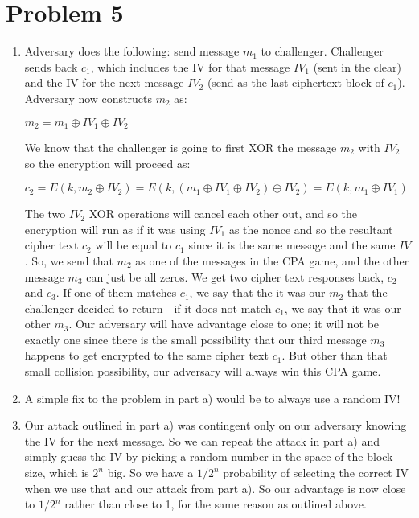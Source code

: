 \documentclass{article}
\begin{document}
\section*{Problem 5}
\begin{enumerate}

\item %
Adversary does the following: send message $m_1$ to challenger. Challenger sends back $c_1$, which includes the IV for that message $IV_1$ (sent in the clear) and the IV for the next message $IV_2$ (send as the last ciphertext block of $c_1$). Adversary now constructs $m_2$ as:

$m_2 = m_1 \oplus IV_1 \oplus IV_2$

We know that the challenger is going to first XOR the message $m_2$ with $IV_2$ so the encryption will proceed as:

$c_2 =  E(k, m_2 \oplus IV_2) =  E(k, (m_1 \oplus IV_1 \oplus IV_2) \oplus IV_2) = E(k, m_1 \oplus IV_1 )$

The two $IV_2$ XOR operations will cancel each other out, and so the encryption will run as if it was using $IV_1$ as the nonce and so the resultant cipher text $c_2$ will be equal to $c_1$ since it is the same message and the same $IV$. So, we send that $m_2$ as one of the messages in the CPA game, and the other message $m_3$ can just be all zeros. We get two cipher text responses back, $c_2$ and $c_3$. If one of them matches $c_1$, we say that the it was our $m_2$ that the challenger decided to return - if it does not match $c_1$, we say that it was our other $m_3$. Our adversary will have advantage close to one; it will not be exactly one since there is the small possibility that our third message $m_3$ happens to get encrypted to the same cipher text $c_1$. But other than that small collision possibility, our adversary will always win this CPA game. 

\item %
A simple fix to the problem in part a) would be to always use a random IV!

\item %
Our attack outlined in part a) was contingent only on our adversary knowing the IV for the next message. So we can repeat the attack in part a) and simply guess the IV by picking a random number in the space of the block size, which is $2^n$ big. So we have a $1/2^n$ probability of selecting the correct IV when we use that and our attack from part a). So our advantage is now close to $1/2^n$ rather than close to 1, for the same reason as outlined above. 
\end{enumerate}
\end{document}
